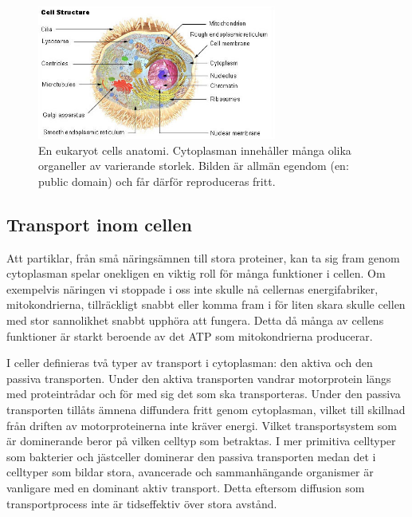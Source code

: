 \begin{figure}\centering
\includegraphics[width=0.7\textwidth]{bilder/Illu_cell_structure.jpg}
\caption{En eukaryot cells anatomi. Cytoplasman innehåller många olika organeller av varierande storlek. \footnotesize Bilden är allmän egendom\cite{wiki:illu_cell_structure} (en: public domain) och får därför reproduceras fritt.}
\label{fig:cell_struktur}
\end{figure}


\subsection{Transport inom cellen}

Att partiklar, från små näringsämnen till stora proteiner, kan ta sig fram genom cytoplasman spelar onekligen en viktig roll för många funktioner i cellen. Om exempelvis näringen vi stoppade i oss inte skulle nå cellernas energifabriker, mitokondrierna, tillräckligt snabbt eller komma fram i för liten skara skulle cellen med stor sannolikhet snabbt upphöra att fungera. Detta då många av cellens funktioner är starkt beroende av det ATP som mitokondrierna\footnotemark{} producerar.

I celler definieras två typer av transport i cytoplasman: den aktiva och den passiva transporten. Under den aktiva transporten vandrar motorprotein längs med proteintrådar och för med sig det som ska transporteras. Under den passiva transporten tillåts ämnena diffundera fritt genom cytoplasman, vilket till skillnad från driften av motorproteinerna inte kräver energi. 
Vilket transportsystem som är dominerande beror på vilken celltyp som betraktas. I mer primitiva celltyper som bakterier och jästceller dominerar den passiva transporten medan det i celltyper som bildar stora, avancerade och sammanhängande organismer är vanligare med en dominant aktiv transport. Detta eftersom diffusion som transportprocess inte är tidseffektiv över stora avstånd.

